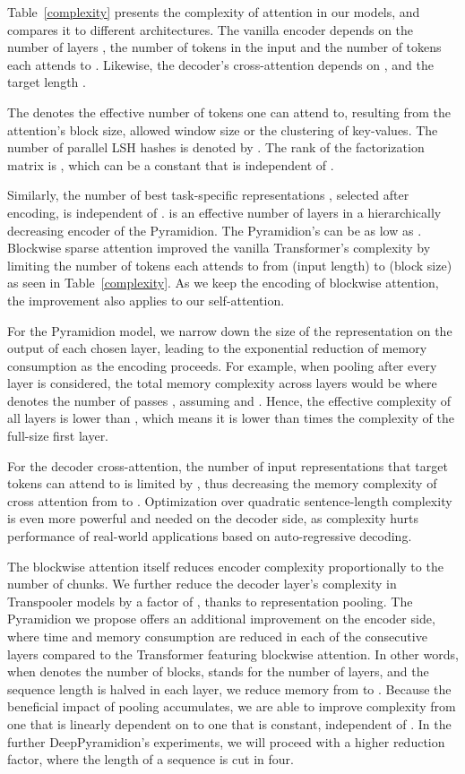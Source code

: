 \documentclass{article}
\begin{document}
  Table~\ref{complexity} presents the complexity of attention in our models, and compares it to different architectures. 
The vanilla encoder depends on the number of layers , the number of tokens in the input  and the number of tokens each attends to . Likewise, the decoder's cross-attention depends on ,  and the target length .

 The  denotes the effective number of tokens one can attend to, resulting from the attention's block size, allowed window size or the clustering of key-values. The number of parallel LSH hashes is denoted by . The rank of the factorization matrix is , which can be a constant that is independent of .

Similarly, the number of best task-specific representations , selected after encoding, is independent of .  is an effective number of layers in a hierarchically decreasing encoder of the Pyramidion. The Pyramidion's  can be as low as .
Blockwise sparse attention improved the vanilla Transformer's complexity by limiting the number of tokens each attends to from  (input length) to  (block size) as seen in Table~\ref{complexity}. As we keep the encoding of blockwise attention, the  improvement also applies to our self-attention. 

For the Pyramidion model, we narrow down the size of the representation on the output of each chosen layer, leading to the exponential reduction of memory consumption as the encoding proceeds. For example, when pooling after every layer is considered, the total memory complexity across  layers would be 
where  denotes the number of passes , assuming  and .
Hence, the effective complexity of all layers is lower than , which means it is lower than  times the complexity of the full-size first layer.

For the decoder cross-attention, the number of input representations that  target tokens can attend to is limited by , thus decreasing the memory complexity of cross attention from   to . Optimization over quadratic sentence-length complexity is even more powerful and needed on the decoder side, as  complexity hurts performance of real-world applications based on auto-regressive decoding.


The blockwise attention itself reduces encoder complexity proportionally to the number of chunks.
We further reduce the decoder layer's complexity in Transpooler models by a factor of , thanks to representation pooling. The Pyramidion we propose offers an additional improvement on the encoder side, where time and memory consumption are reduced in each of the consecutive layers compared to the Transformer featuring blockwise attention. In other words, when  denotes the number of blocks,  stands for the number of layers, and the sequence length is halved in each layer, we reduce memory from  to .
Because the beneficial impact of pooling accumulates, we are able to improve complexity from one that is linearly dependent on  to one that is constant, independent of . In the further DeepPyramidion's experiments, we will proceed with a higher reduction factor, where the length of a sequence is cut in four.
\end{document}
